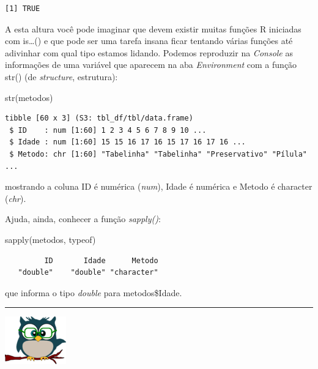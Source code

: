 \documentclass[
]{article}
\newenvironment{Shaded}{\begin{snugshade}}{\end{snugshade}}
\newcommand{\FunctionTok}[1]{\textcolor[rgb]{0.00,0.00,0.00}{#1}}
\newcommand{\NormalTok}[1]{#1}
\begin{document}
\begin{verbatim}
[1] TRUE
\end{verbatim}

A esta altura você pode imaginar que devem existir muitas funções R
iniciadas com is\ldots() e que pode ser uma tarefa insana ficar tentando
várias funções até adivinhar com qual tipo estamos lidando. Podemos
reproduzir na \emph{Console} as informações de uma variável que aparecem
na aba \emph{Environment} com a função str() (de \emph{structure},
estrutura):

\begin{Shaded}
\begin{Highlighting}[]
\FunctionTok{str}\NormalTok{(metodos)}
\end{Highlighting}
\end{Shaded}

\begin{verbatim}
tibble [60 x 3] (S3: tbl_df/tbl/data.frame)
 $ ID    : num [1:60] 1 2 3 4 5 6 7 8 9 10 ...
 $ Idade : num [1:60] 15 15 16 17 16 15 17 16 17 16 ...
 $ Metodo: chr [1:60] "Tabelinha" "Tabelinha" "Preservativo" "Pílula" ...
\end{verbatim}

mostrando a coluna ID é numérica (\emph{num}), Idade é numérica e Metodo
é character (\emph{chr}).

Ajuda, ainda, conhecer a função \emph{sapply()}:

\begin{Shaded}
\begin{Highlighting}[]
\FunctionTok{sapply}\NormalTok{(metodos, typeof)}
\end{Highlighting}
\end{Shaded}

\begin{verbatim}
         ID       Idade      Metodo 
   "double"    "double" "character" 
\end{verbatim}

que informa o tipo \emph{double} para metodos\$Idade.

\begin{center}\rule{0.5\linewidth}{0.5pt}\end{center}

\begin{flushleft}\includegraphics[width=0.08\linewidth]{coruja} \end{flushleft}
\end{document}
